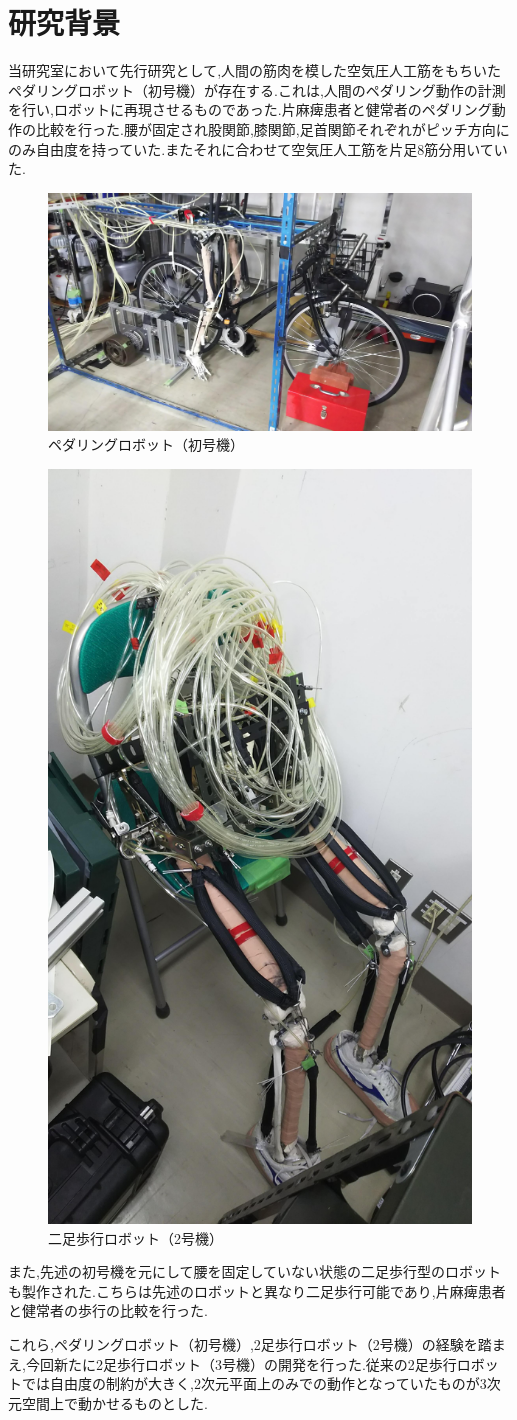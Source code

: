 \section{研究背景}
当研究室において先行研究として,人間の筋肉を模した空気圧人工筋をもちいたペダリングロボット（初号機）が存在する.これは,人間のペダリング動作の計測を行い,ロボットに再現させるものであった.片麻痺患者と健常者のペダリング動作の比較を行った.腰が固定され股関節,膝関節,足首関節それぞれがピッチ方向にのみ自由度を持っていた.またそれに合わせて空気圧人工筋を片足8筋分用いていた.
\begin{figure}[!t]
 \begin{center}
  \includegraphics[width=0.5\columnwidth,clip]{Photo/BackGround/1st.eps}
  \caption{ペダリングロボット（初号機）}
  \label{初号機}
  \end{center}
  \end{figure}
  \begin{figure}
  \begin{center}
  \includegraphics[width=0.25\columnwidth,clip]{Photo/BackGround/2nd.eps}
  \caption{二足歩行ロボット（2号機）}
  \label{2号機}
 \end{center}
\end{figure}

また,先述の初号機を元にして腰を固定していない状態の二足歩行型のロボットも製作された.こちらは先述のロボットと異なり二足歩行可能であり,片麻痺患者と健常者の歩行の比較を行った.

これら,ペダリングロボット（初号機）,2足歩行ロボット（2号機）の経験を踏まえ,今回新たに2足歩行ロボット（3号機）の開発を行った.従来の2足歩行ロボットでは自由度の制約が大きく,2次元平面上のみでの動作となっていたものが3次元空間上で動かせるものとした.

